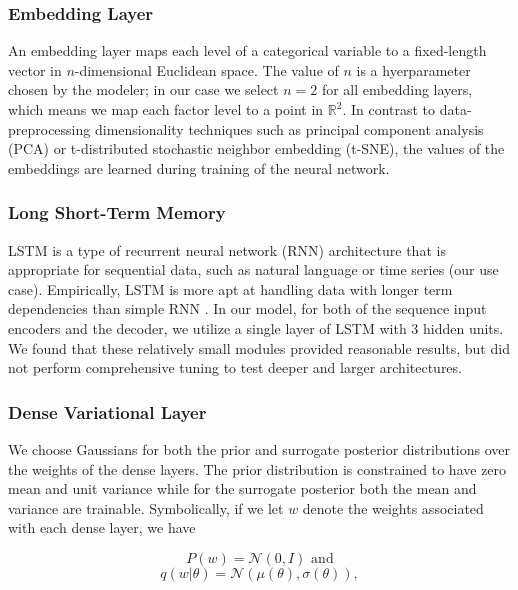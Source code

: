 \documentclass{article}
\begin{document}
\subsubsection{Embedding Layer}

An embedding layer maps each level of a categorical variable to a fixed-length 
vector in $n$-dimensional Euclidean space. The value of $n$ is a hyerparameter 
chosen by the modeler; in our case we select $n = 2$ for all embedding layers, 
which means we map each factor level to a point in $\mathbb{R}^2$. In contrast 
to data-preprocessing dimensionality techniques such as principal component 
analysis (PCA) or t-distributed stochastic neighbor embedding (t-SNE), the 
values of the embeddings are learned during training of the neural network.

\subsubsection{Long Short-Term Memory}

LSTM is a type of recurrent neural network (RNN) architecture that is 
appropriate for sequential data, such as natural language or time series (our 
use case). Empirically, LSTM is more apt at handling data with longer term 
dependencies than simple RNN \cite{lecunDeepLearning2015}. In our model, for 
both of the sequence input encoders and the decoder, we utilize a single layer 
of LSTM with 3 hidden units. We found that these relatively small modules 
provided reasonable results, but did not perform comprehensive tuning to test
deeper and larger architectures. 

\subsubsection{Dense Variational Layer}

We choose Gaussians for both the prior and surrogate posterior distributions 
over the weights of the dense layers. The prior distribution is constrained to 
have zero mean and unit variance while for the surrogate posterior both the mean and
variance are trainable. Symbolically, if we let $w$ denote the weights 
associated with each dense layer, we have

\begin{equation}
    P(w) = \mathcal{N}(0, I) \text{ and}
\end{equation}
\begin{equation}
    q(w|\theta) = \mathcal{N}(\mu(\theta), \sigma(\theta)),
\end{equation}
\end{document}

